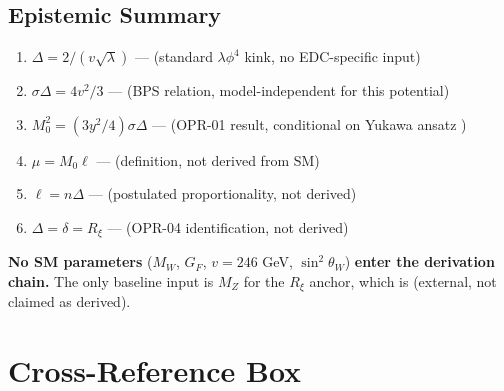 \subsection{Epistemic Summary}
\label{subsec:ch16_epistemic_summary}

\begin{tcolorbox}[colback=green!5!white, colframe=green!50!black,
    title=\textbf{No-Smuggling / Epistemic Checklist}]
\begin{enumerate}[nosep]
    \item[$\checkmark$] \textbf{$\Delta = 2/(v\sqrt{\lambda})$} — \tagM{}
    (standard $\lambda\phi^4$ kink, no EDC-specific input)

    \item[$\checkmark$] \textbf{$\sigma\Delta = 4v^2/3$} — \tagM{}
    (BPS relation, model-independent for this potential)

    \item[$\checkmark$] \textbf{$M_0^2 = (3y^2/4)\sigma\Delta$} — \tagDc{}
    (OPR-01 result, conditional on Yukawa ansatz \tagP{})

    \item[$\checkmark$] \textbf{$\mu = M_0 \ell$} — \tagDc{}
    (definition, not derived from SM)

    \item[$\times$] \textbf{$\ell = n\Delta$} — \tagP{}
    (postulated proportionality, not derived)

    \item[$\times$] \textbf{$\Delta = \delta = R_\xi$} — \tagP{}
    (OPR-04 identification, not derived)
\end{enumerate}

\medskip
\textbf{No SM parameters} ($M_W$, $G_F$, $v = 246$ GeV, $\sin^2\theta_W$)
\textbf{enter the derivation chain.} The only baseline input is $M_Z$ for
the $R_\xi$ anchor, which is \tagBL{} (external, not claimed as derived).
\end{tcolorbox}

\section{Cross-Reference Box}
\label{sec:ch16_crossref}

